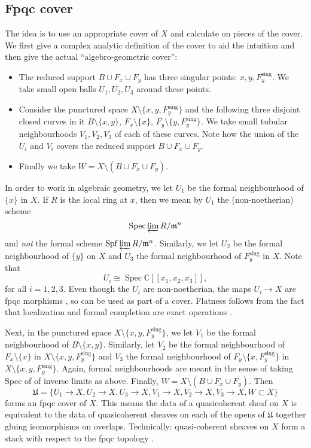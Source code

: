 \documentclass{amsart}
\theoremstyle{definition}
\newcommand{\CC} {\mathbb{C}}          %
\newcommand{\Spec}{\operatorname{Spec}}
\newcommand{\sing}{\operatorname{sing}}
\begin{document}
\subsection{Fpqc cover}

The idea is to use an appropriate cover of $X$ and calculate on pieces of the cover. We first give a complex analytic definition of the cover to aid the intuition and then give the actual ``algebro-geometric cover'': 
\begin{itemize}
\item The reduced support $B \cup F_x \cup F_y$ has three singular points: $x,y, F_{y}^{\sing}$. We take small open balls $U_1, U_2, U_3$ around these points.
\item Consider the punctured space $X \setminus \{x,y, F_{y}^{\sing}\}$ and the following three disjoint closed curves in it $B \setminus \{x,y\}$, $F_x \setminus \{x\}$, $F_y \setminus \{y,F_{y}^{\sing}\}$. We take small tubular neighbourhoods $V_1, V_2, V_3$ of each of these curves. Note how the union of the $U_i$ and $V_i$ covers the reduced support  $B \cup F_x \cup F_y$.
\item Finally we take $W = X \setminus (B \cup F_x \cup F_y)$. 
\end{itemize}

In order to work in algebraic geometry, we let $U_1$ be the formal neighbourhood of $\{x\}$ in $X$. If $R$ is the local ring at $x$, then we mean by $U_1$ the (non-noetherian) scheme
$$
\Spec \varprojlim R / \mathfrak{m}^n 
$$
and \emph{not} the formal scheme $\mathrm{Spf} \varprojlim R / \mathfrak{m}^n$. Similarly, we let $U_2$ be the formal neighbourhood of $\{y\}$ on $X$ and $U_3$ the formal neighbourhood of $F_{y}^{\sing}$ in $X$. Note that 
$$
U_i \cong\Spec \CC[\![x_1,x_2,x_3]\!],
$$
for all $i=1,2,3$. Even though the $U_i$ are non-noetherian, the maps $U_i \rightarrow X$ are fpqc morphisms \cite{Vis}, so can be used as part of a cover. Flatness follows from the fact that localization and formal completion are exact operations \cite[Cor.~3.6, Prop.~10.12, Prop.~10.13]{AM}. 

Next, in the punctured space $X \setminus \{x,y,F_{y}^{\sing}\}$, we let $V_1$ be the formal neighbourhood of $B \setminus \{x,y\}$. Similarly, let $V_2$ be the formal neighbourhood of $F_x \setminus \{x\}$ in $X \setminus \{x,y,F_{y}^{\sing}\}$ and $V_3$ the formal neighbourhood of $F_y \setminus \{x, F_{y}^{\sing}\}$ in $X \setminus \{x,y,F_{y}^{\sing}\}$. Again, formal neighbourhoods are meant in the sense of taking Spec of of inverse limits as above. Finally, $W = X \setminus (B \cup F_x \cup F_y)$. Then
$$
\mathfrak{U} = \{U_1 \rightarrow X, U_2 \rightarrow X, U_3 \rightarrow X, V_1 \rightarrow X, V_2 \rightarrow X, V_3 \rightarrow X, W \subset X\}
$$
forms an fpqc cover of $X$. This means the data of a quasicoherent sheaf on $X$ is equivalent to the data of quasicoherent sheaves on each of the opens of $\mathfrak{U}$ together gluing isomorphisms on overlaps. Technically: quasi-coherent sheaves on $X$ form a stack with respect to the fpqc topology \cite[Thm.~4.23]{Vis}.
\end{document}
